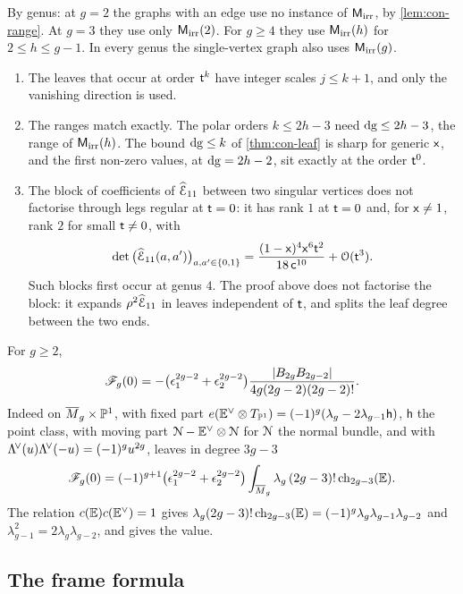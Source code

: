 By genus: at $g=2$ the graphs with an edge use no instance of $\mathsf{M}_{\mathrm{irr}}$, by \cref{lem:con-range}. At $g=3$ they use only $\mathsf{M}_{\mathrm{irr}}(2)$. For $g\geq 4$ they use $\mathsf{M}_{\mathrm{irr}}(h)$ for $2\leq h\leq g-1$. In every genus the single-vertex graph also uses $\mathsf{M}_{\mathrm{irr}}(g)$.

\begin{rmk}\leavevmode
\begin{enumerate}
\item The leaves that occur at order $\mathsf{t}^k$ have integer scales $j\leq k+1$, and only the vanishing direction is used.
\item The ranges match exactly. The polar orders $k\leq 2h-3$ need $\mathrm{dg}\leq 2h-3$, the range of $\mathsf{M}_{\mathrm{irr}}(h)$. The bound $\mathrm{dg}\leq k$ of \cref{thm:con-leaf} is sharp for generic $\mathsf{x}$, and the first non-zero values, at $\mathrm{dg}=2h-2$, sit exactly at the order $\mathsf{t}^0$.
\item The block of coefficients of $\widehat{\mathcal{E}}_{11}$ between two singular vertices does not factorise through legs regular at $\mathsf{t}=0$: it has rank $1$ at $\mathsf{t}=0$ and, for $\mathsf{x}\neq 1$, rank $2$ for small $\mathsf{t}\neq 0$, with
\[
\det\big(\widehat{\mathcal{E}}_{11}(a,a')\big)_{a,a'\in\{0,1\}}=\frac{(1-\mathsf{x})^4\mathsf{x}^6\mathsf{t}^2}{18\,\mathsf{c}^{10}}+\mathcal{O}(\mathsf{t}^3).
\]
Such blocks first occur at genus $4$. The proof above does not factorise the block: it expands $\rho^2\widehat{\mathcal{E}}_{11}$ in leaves independent of $\mathsf{t}$, and splits the leaf degree between the two ends.
\end{enumerate}
\end{rmk}

\begin{rmk}
For $g\geq 2$,
\[
\mathscr{F}_g(0)=-\big(\epsilon_1^{2g-2}+\epsilon_2^{2g-2}\big)\frac{|B_{2g}B_{2g-2}|}{4g(2g-2)(2g-2)!}.
\]
Indeed \cite{GP99} on $\overline{M}_g\times\mathbb{P}^1$, with fixed part $e(\mathbb{E}^\vee\otimes T_{\mathbb{P}^1})=(-1)^g(\lambda_g-2\lambda_{g-1}\mathsf{h})$, $\mathsf{h}$ the point class, with moving part $\mathcal{N}-\mathbb{E}^\vee\otimes\mathcal{N}$ for $\mathcal{N}$ the normal bundle, and with $\Lambda^{\!\vee}(u)\Lambda^{\!\vee}(-u)=(-1)^gu^{2g}$, leaves in degree $3g-3$
\[
\mathscr{F}_g(0)=(-1)^{g+1}\big(\epsilon_1^{2g-2}+\epsilon_2^{2g-2}\big)\int_{\overline{M}_g}\lambda_g\,(2g-3)!\,\mathrm{ch}_{2g-3}(\mathbb{E}).
\]
The relation $c(\mathbb{E})c(\mathbb{E}^\vee)=1$ gives $\lambda_g(2g-3)!\,\mathrm{ch}_{2g-3}(\mathbb{E})=(-1)^g\lambda_g\lambda_{g-1}\lambda_{g-2}$ and $\lambda_{g-1}^2=2\lambda_g\lambda_{g-2}$, and \cite[Theorem~4]{FP00} gives the value.
\end{rmk}

\subsection{The frame formula}

